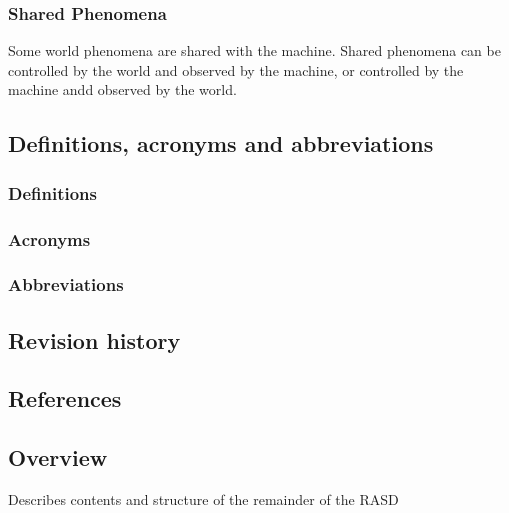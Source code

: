 \subsubsection{Shared Phenomena}
\label{subsubsect:sharedphenomena}

Some world phenomena are shared with the machine.
Shared phenomena can be controlled by the world and observed by the machine, or controlled by the machine andd observed by the world.

\subsection{Definitions, acronyms and abbreviations}
\label{subsect:definitionsacronymsabbreviations}

\subsubsection{Definitions}
\label{subsect:definitions}

\subsubsection{Acronyms}
\label{subsect:acronyms}

\subsubsection{Abbreviations}
\label{subsect:abbreviations}

\subsection{Revision history}
\label{subsect:revisionhistory}

\subsection{References}
\label{subsect:references}

\subsection{Overview}
\label{subsect:overview}

Describes contents and structure of the remainder of the RASD